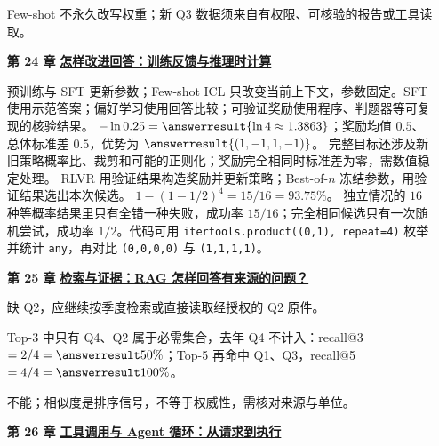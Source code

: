 \begin{enumerate}[leftmargin=5.4em,labelsep=.7em,itemsep=9pt]
\par{}Few-shot 不永久改写权重；新 Q3 数据须来自有权限、可核验的报告或工具读取。
\par{}
\item[\textbf{第 24 章}] \label{answer:23c-post-training}\textbf{\hyperref[check:23c-post-training]{怎样改进回答：训练反馈与推理时计算}}\par\nobreak
{}\label{answer:23cc-test-time-compute}
预训练与 SFT 更新参数；Few-shot ICL 只改变当前上下文，参数固定。SFT 使用示范答案；偏好学习使用回答比较；可验证奖励使用程序、判题器等可复现的核验结果。
$-\ln0.25=\answerresult{\ln4\approx1.3863}$；奖励均值 $0.5$、总体标准差 $0.5$，优势为 $\answerresult{(1,-1,1,-1)}$。
完整目标还涉及新旧策略概率比、裁剪和可能的正则化；奖励完全相同时标准差为零，需数值稳定处理。
RLVR 用验证结果构造奖励并更新策略；Best-of-$n$ 冻结参数，用验证结果选出本次候选。
$1-(1-1/2)^4=15/16=93.75\%$。
独立情况的 $16$ 种等概率结果里只有全错一种失败，成功率 $15/16$；完全相同候选只有一次随机尝试，成功率 $1/2$。代码可用 \texttt{itertools.product((0,1), repeat=4)} 枚举并统计 \texttt{any}，再对比 \texttt{(0,0,0,0)} 与 \texttt{(1,1,1,1)}。
\par{}
\item[\textbf{第 25 章}] \label{answer:23d-agent-rag}\textbf{\hyperref[check:23d-agent-rag]{检索与证据：RAG 怎样回答有来源的问题？}}\par\nobreak
{}缺 Q2，应继续按季度检索或直接读取经授权的 Q2 原件。
\par{}Top-3 中只有 Q4、Q2 属于必需集合，去年 Q4 不计入：recall@3 $=2/4=\answerresult{50\%}$；Top-5 再命中 Q1、Q3，recall@5 $=4/4=\answerresult{100\%}$。
\par{}不能；相似度是排序信号，不等于权威性，需核对来源与单位。
\par{}
\item[\textbf{第 26 章}] \label{answer:23d-agent-tools}\textbf{\hyperref[check:23d-agent-tools]{工具调用与 Agent 循环：从请求到执行}}\par\nobreak

\end{enumerate}
